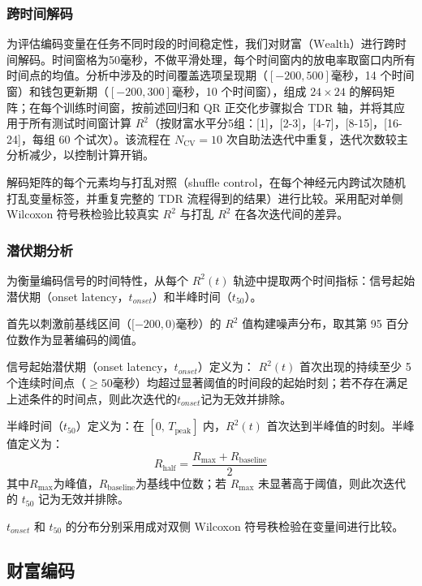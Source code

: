 \subsubsection{跨时间解码}

为评估编码变量在任务不同时段的时间稳定性，我们对财富（$\mathrm{Wealth}$）进行跨时间解码。时间窗格为50毫秒，不做平滑处理，每个时间窗内的放电率取窗口内所有时间点的均值。分析中涉及的时间覆盖选项呈现期（$[-200,500]$毫秒，14 个时间窗）和钱包更新期（$[-200,300]$毫秒，10 个时间窗），组成 $24 \times 24$ 的解码矩阵；在每个训练时间窗，按前述回归和 QR 正交化步骤拟合 TDR 轴，并将其应用于所有测试时间窗计算 $R^2$（按财富水平分5组：[1]，[2-3]，[4-7]，[8-15]，[16-24]，每组 60 个试次）。该流程在 $N_\mathrm{CV} = 10$ 次自助法迭代中重复，迭代次数较主分析减少，以控制计算开销。

解码矩阵的每个元素均与打乱对照（shuffle control，在每个神经元内跨试次随机打乱变量标签，并重复完整的 TDR 流程得到的结果）进行比较。采用配对单侧 Wilcoxon 符号秩检验比较真实 $R^2$ 与打乱 $R^2$ 在各次迭代间的差异。

\subsubsection{潜伏期分析}

为衡量编码信号的时间特性，从每个 $R^2(t)$ 轨迹中提取两个时间指标：信号起始潜伏期（onset latency，$t_{onset}$）和半峰时间（$t_{50}$）。

首先以刺激前基线区间（$[-200,0)$毫秒）的 $R^2$ 值构建噪声分布，取其第 95 百分位数作为显著编码的阈值。

信号起始潜伏期（onset latency，$t_{onset}$）定义为： $R^2(t)$ 首次出现的持续至少 5 个连续时间点（$\geq 50$毫秒）均超过显著阈值的时间段的起始时刻；若不存在满足上述条件的时间点，则此次迭代的$t_{onset}$记为无效并排除。

半峰时间（$t_{50}$）定义为：在 $[0,\,T_\mathrm{peak}]$ 内，$R^2(t)$ 首次达到半峰值的时刻。半峰值定义为：
\begin{equation}
    R_\mathrm{half} = \frac{R_\mathrm{max} + R_\mathrm{baseline}}{2}
\end{equation}
其中$R_\mathrm{max}$为峰值，$R_\mathrm{baseline}$为基线中位数；若 $R_\mathrm{max}$ 未显著高于阈值，则此次迭代的 $t_{50}$ 记为无效并排除。

$t_{onset}$ 和 $t_{50}$ 的分布分别采用成对双侧 Wilcoxon 符号秩检验在变量间进行比较。

\subsection{财富编码}\label{chap2:methods_neural_wealth}
